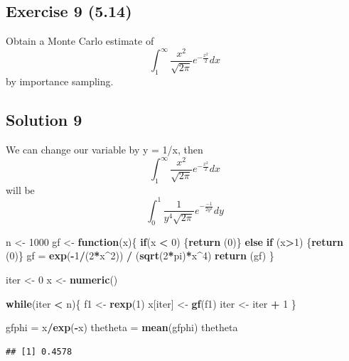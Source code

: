 \documentclass[
]{article}
\newenvironment{Shaded}{\begin{snugshade}}{\end{snugshade}}
\newcommand{\ControlFlowTok}[1]{\textcolor[rgb]{0.13,0.29,0.53}{\textbf{#1}}}
\newcommand{\DecValTok}[1]{\textcolor[rgb]{0.00,0.00,0.81}{#1}}
\newcommand{\KeywordTok}[1]{\textcolor[rgb]{0.13,0.29,0.53}{\textbf{#1}}}
\newcommand{\NormalTok}[1]{#1}
\newcommand{\OperatorTok}[1]{\textcolor[rgb]{0.81,0.36,0.00}{\textbf{#1}}}
\newcommand{\StringTok}[1]{\textcolor[rgb]{0.31,0.60,0.02}{#1}}
\begin{document}
\hypertarget{exercise-9-5.14}{%
\subsection{Exercise 9 (5.14)}\label{exercise-9-5.14}}

Obtain a Monte Carlo estimate of
\[\int_1^{\infty}\frac{x^2}{\sqrt{2\pi}} e^{-\frac{x^2}{2}} dx \] by
importance sampling.

\hypertarget{solution-9}{%
\subsection{Solution 9}\label{solution-9}}

We can change our variable by y = 1/x, then
\[\int_1^{\infty}\frac{x^2}{\sqrt{2\pi}} e^{-\frac{x^2}{2}} dx \] will
be \[\int_0^{1}\frac{1}{y^4\sqrt{2\pi}} e^{-\frac{-1}{2y^2}} dy \]

\begin{Shaded}
\begin{Highlighting}[]
\NormalTok{n <-}\StringTok{ }\DecValTok{1000}
\NormalTok{gf <-}\StringTok{ }\ControlFlowTok{function}\NormalTok{(x)\{}
  \ControlFlowTok{if}\NormalTok{(x }\OperatorTok{<}\StringTok{ }\DecValTok{0}\NormalTok{) \{}\KeywordTok{return}\NormalTok{ (}\DecValTok{0}\NormalTok{)\}}
  \ControlFlowTok{else} \ControlFlowTok{if}\NormalTok{ (x}\OperatorTok{>}\DecValTok{1}\NormalTok{) \{}\KeywordTok{return}\NormalTok{ (}\DecValTok{0}\NormalTok{)\}}
\NormalTok{  gf =}\StringTok{ }\KeywordTok{exp}\NormalTok{(}\OperatorTok{-}\DecValTok{1}\OperatorTok{/}\NormalTok{(}\DecValTok{2}\OperatorTok{*}\NormalTok{x}\OperatorTok{^}\DecValTok{2}\NormalTok{)) }\OperatorTok{/}\StringTok{ }\NormalTok{(}\KeywordTok{sqrt}\NormalTok{(}\DecValTok{2}\OperatorTok{*}\NormalTok{pi)}\OperatorTok{*}\NormalTok{x}\OperatorTok{^}\DecValTok{4}\NormalTok{)}
  \KeywordTok{return}\NormalTok{ (gf)}
\NormalTok{\}}

\NormalTok{iter <-}\StringTok{ }\DecValTok{0}
\NormalTok{x <-}\StringTok{ }\KeywordTok{numeric}\NormalTok{()}

\ControlFlowTok{while}\NormalTok{(iter }\OperatorTok{<}\StringTok{ }\NormalTok{n)\{}
\NormalTok{  f1 <-}\StringTok{ }\KeywordTok{rexp}\NormalTok{(}\DecValTok{1}\NormalTok{)}
\NormalTok{  x[iter] <-}\StringTok{ }\KeywordTok{gf}\NormalTok{(f1)}
\NormalTok{  iter <-}\StringTok{ }\NormalTok{iter }\OperatorTok{+}\StringTok{ }\DecValTok{1}
\NormalTok{\}}

\NormalTok{gfphi =}\StringTok{ }\NormalTok{x}\OperatorTok{/}\KeywordTok{exp}\NormalTok{(}\OperatorTok{-}\NormalTok{x)}
\NormalTok{thetheta =}\StringTok{ }\KeywordTok{mean}\NormalTok{(gfphi)}
\NormalTok{thetheta}
\end{Highlighting}
\end{Shaded}

\begin{verbatim}
## [1] 0.4578
\end{verbatim}
\end{document}
